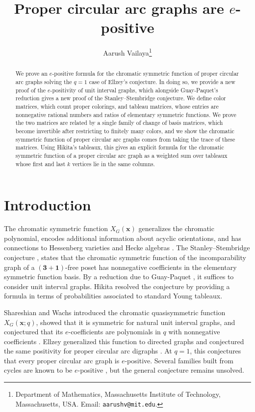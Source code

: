 \documentclass[12pt]{article}
\title{Proper circular arc graphs are $e$-positive}
\author{Aarush Vailaya\thanks{Department of Mathematics, Massachusetts Institute of Technology, Massachusetts, USA. Email: \texttt{aarushv@mit.edu}.}}
\date{}
\theoremstyle{plain}
\theoremstyle{definition}
\theoremstyle{remark}
\begin{document}
\maketitle

\begin{abstract}
We prove an $e$-positive formula for the chromatic symmetric function of proper circular arc graphs solving the $q=1$ case of Ellzey's conjecture. In doing so, we provide a new proof of the $e$-positivity of unit interval graphs, which alongside Guay-Paquet's reduction gives a new proof of the Stanley--Stembridge conjecture. We define color matrices, which count proper colorings, and tableau matrices, whose entries are nonnegative rational numbers and ratios of elementary symmetric functions. We prove the two matrices are related by a single family of change of basis matrices, which become invertible after restricting to finitely many colors, and we show the chromatic symmetric function of proper circular arc graphs comes from taking the trace of these matrices. Using Hikita's tableaux, this gives an explicit formula for the chromatic symmetric function of a proper circular arc graph as a weighted sum over tableaux whose first and last $k$ vertices lie in the same columns.


\end{abstract}

\section{Introduction}\label{section:introduction}
The chromatic symmetric function $X_G(\bm x)$ generalizes the chromatic
polynomial, encodes additional information about acyclic orientations, and
has connections to Hessenberg varieties \cite{dothessenberg,chromquasihessenberg}
and Hecke algebras \cite{chromhecke,chromcharacters}. The Stanley--Stembridge conjecture
\cite[Conjecture 5.1]{chromsym}, \cite[Conjecture 5.5]{stanstem} states that the chromatic symmetric function of the incomparability graph
of a $(\bm 3+\bm 1)$-free poset has nonnegative coefficients in the
elementary symmetric function basis. By a reduction due to Guay-Paquet
\cite[Theorem 5.1]{stanstemreduction}, it suffices to consider unit interval
graphs. Hikita \cite[Theorem 1.6 and Corollary 1.8]{stanstemproof} resolved
the conjecture by providing a formula in terms of probabilities associated
to standard Young tableaux.

Shareshian and Wachs introduced the chromatic quasisymmetric function
$X_G(\bm x;q)$, showed that it is symmetric for natural unit interval
graphs, and conjectured that its $e$-coefficients are polynomials in $q$
with nonnegative coefficients \cite{chromposquasi}. Ellzey generalized
this function to directed graphs and conjectured the same positivity for
proper circular arc digraphs \cite[Conjecture 1.4]{chromquasidi}.
At $q=1$, this conjectures that every proper circular arc graph is $e$-positive.
Several families built from cycles are known to be $e$-positive
\cite{graphtwin,cyclechains,cyclechordsepositive}, but the general conjecture remains unsolved.
\end{document}
